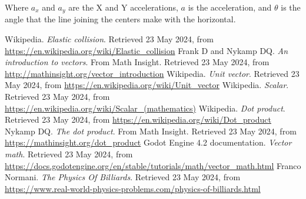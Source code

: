 \documentclass{amsart}
\begin{document}
Where $a_x$ and $a_y$ are the X and Y accelerations, $a$ is the acceleration,
and $\theta$ is the angle that the line joining the centers make with the
horizontal.


\begin{thebibliography}{9}
  Wikipedia. \textit{Elastic collision}. Retrieved 23 May 2024, from
  \url{https://en.wikipedia.org/wiki/Elastic_collision}
  Frank D and Nykamp DQ. \textit{An introduction to vectors}. From Math Insight. Retrieved 23 May 2024, from
  \url{http://mathinsight.org/vector_introduction}
  Wikipedia. \textit{Unit vector}. Retrieved 23 May 2024, from
  \url{https://en.wikipedia.org/wiki/Unit_vector}
  Wikipedia. \textit{Scalar}. Retrieved 23 May 2024, from
  \url{https://en.wikipedia.org/wiki/Scalar_(mathematics)}
  Wikipedia. \textit{Dot product}. Retrieved 23 May 2024, from
  \url{https://en.wikipedia.org/wiki/Dot_product}
  Nykamp DQ. \textit{The dot product}. From Math Insight. Retrieved 23 May 2024, from
  \url{https://mathinsight.org/dot_product}
  Godot Engine 4.2 documentation. \textit{Vector math}. Retrieved 23 May 2024, from
  \url{https://docs.godotengine.org/en/stable/tutorials/math/vector_math.html}
  Franco Normani. \textit{The Physics Of Billiards}. Retrieved 23 May 2024, from
  \url{https://www.real-world-physics-problems.com/physics-of-billiards.html}
\end{thebibliography}
\end{document}
